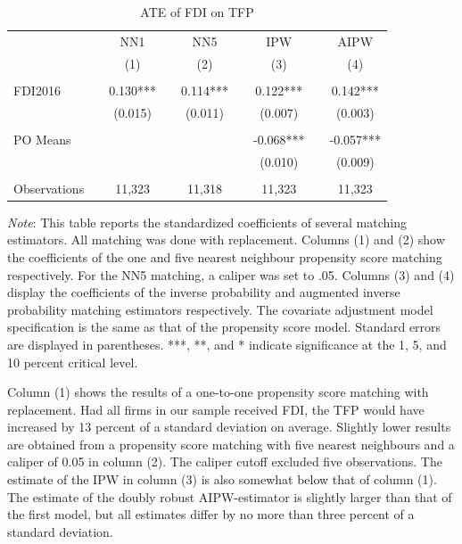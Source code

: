 \documentclass[a4paper,11pt]{scrartcl}
\begin{document}
\begin{table}[h!]
 	\centering
   	\caption{ATE of FDI on TFP}
   	\label{tab:mainresults}
\begin{threeparttable}
	
 \begin{tabular}{l*{8}{c}}
	\hline
	\hline
 			&& NN1 && NN5 && IPW && AIPW \\
 			&& (1) && (2) && (3)  && (4) \\ \hline
 			&&  &&  &&  &&    \\
FDI2016 	&& 0.130*** && 0.114*** && 0.122***  && 0.142***   \\
 			&& (0.015) && (0.011) && (0.007) &&   (0.003)  \\
 	&&  &&  &&  &&    \\
PO Means 	&& && && -0.068*** &&  -0.057*** \\
			&&  &&  && (0.010)  &&  (0.009) \\
			&&  &&  &&  &&    \\
 Observations && 11,323 && 11,318 && 11,323 && 11,323 \\ 
 	\hline
 	\hline 
\end{tabular}

\begin{tablenotes}[flushleft]
      \footnotesize
\item \textit{Note}: This table reports the standardized coefficients of several matching estimators. All matching was done with replacement. Columns (1) and (2) show the coefficients of the one and five nearest neighbour propensity score matching respectively. For the NN5 matching, a caliper was set to .05. Columns (3) and (4) display the coefficients of the inverse probability and augmented inverse probability matching estimators respectively. The covariate adjustment model specification is the same as that of the propensity score model. Standard errors are displayed in parentheses. ***, **, and * indicate significance at the 1, 5, and 10 percent critical level.

\end{tablenotes}

\end{threeparttable}
\end{table}

Column (1) shows the results of a one-to-one propensity score matching with replacement. Had all firms in our sample received FDI, the TFP would have increased by 13 percent of a standard deviation on average. Slightly lower results are obtained from a propensity score matching with five nearest neighbours and a caliper of 0.05 in column (2). The caliper cutoff excluded five observations. The estimate of the IPW in column (3) is also somewhat below that of column (1). The estimate of the doubly robust AIPW-estimator is slightly larger than that of the first model, but all estimates differ by no more than three percent of a standard deviation.
\end{document}
